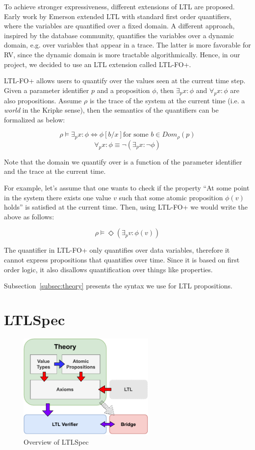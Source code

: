 \documentclass[format=acmsmall, nonacm=true, review=true, screen=true]{acmart}
\newcommand{\mycaption}[1]{\Description{#1}\caption{#1}}
\begin{document}
To achieve stronger expressiveness, different extensions of LTL are proposed. Early work by Emerson \cite{emerson1990temporal} extended LTL with standard first order quantifiers, where the variables are quantified over a fixed domain. A different approach, inspired by the database community, quantifies the variables over a dynamic domain, e.g. over variables that appear in a trace. The latter is more favorable for RV, since the dynamic domain is more tractable algorithmically. Hence, in our project, we decided to use an LTL extension called LTL-FO+.

LTL-FO+ allows users to quantify over the values seen at the current time step. Given a parameter identifier $p$ and a proposition $\phi$, then $\exists_{p} x : \phi$ and $\forall_{p} x:\phi$ are also propositions. Assume $\rho$ is the trace of the system at the current time (i.e. a \textit{world} in the Kripke sense), then the semantics of the quantifiers can be formalized as below:

$$\rho\vDash \exists_p x:\phi \Leftrightarrow \phi[b/x] \text{for some }b\in Dom_{\rho}(p)$$
$$\forall_{p} x : \phi \equiv \lnot(\exists_{p}x: \lnot\phi)$$

Note that the domain we quantify over is a function of the parameter identifier and the trace at the current time.

For example, let's assume that one wants to check if the property “At some point in the system there exists one value $v$ such that some atomic proposition $\phi(v)$ holds” is satisfied at the current time. Then, using LTL-FO+ we would write the above as follows:

$$ \rho \vDash \Diamond(\exists_{p} v :\phi(v)) $$

The quantifier in LTL-FO+ only quantifies over data variables, therefore it cannot express propositions that quantifies over time. Since it is based on first order logic, it also disallows quantification over things like properties.

Subsection~\ref{subsec:theory} presents the syntax we use for LTL propositions.

\section{LTLSpec}

\begin{figure}[h]
  \includegraphics[width=0.6\textwidth]{images/ltlspec-overview.pdf}
  \centering
  \mycaption{Overview of LTLSpec}
  \label{fig:overview}
\end{figure}
\end{document}
